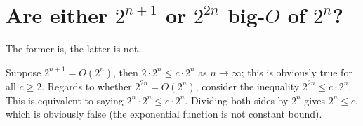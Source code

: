 \section[Problem 4]{Are either $2^{n + 1}$ or $2^{2n}$ big-$O$ of $2^n$?}

The former is, the latter is not. 

Suppose $2^{n + 1} = O(2^n)$, then $2 \cdot 2^n \leq c \cdot 2^n$ as $n \rightarrow \infty$; this is obviously true for all $c \geq 2$.  Regards to whether $2^{2n} = O(2^n)$, consider the inequality $2^{2n} \leq c \cdot 2^n$. This is equivalent to saying $2^n \cdot 2^n \leq c \cdot 2^n$. Dividing both sides by $2^n$ gives $2^n \leq c$, which is obviously false (the exponential function is not constant bound).
